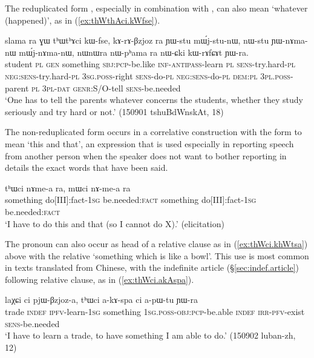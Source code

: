The reduplicated form , especially in combination with , can also mean `whatever (happened)', as in (\ref{ex:thWthAci.kWfse}).
 
 \begin{exe}
\ex \label{ex:thWthAci.kWfse}
\gll  slama ra ɣɯ tʰɯtʰɤci kɯ-fse, kɤ-rɤ-βzjoz ra ɲɯ-stu mɯ́j-stu-nɯ, nɯ-stu ɲɯ-nɤma-nɯ mɯ́j-nɤma-nɯ,  nɯnɯra nɯ-pʰama ra nɯ-ɕki kɯ-rɤfɕɤt ɲɯ-ra. \\
student \textsc{pl} \textsc{gen} something \textsc{sbj}:\textsc{pcp}-be.like \textsc{inf}-\textsc{antipass}-learn \textsc{pl} \textsc{sens}-try.hard-\textsc{pl} \textsc{neg}:\textsc{sens}-try.hard-\textsc{pl} \textsc{3sg}.\textsc{poss}-right \textsc{sens}-do-\textsc{pl} \textsc{neg}:\textsc{sens}-do-\textsc{pl} \textsc{dem}:\textsc{pl} \textsc{3pl}.\textsc{poss}-parent \textsc{pl} \textsc{3pl}-\textsc{dat} \textsc{genr}:S/O-tell \textsc{sens}-be.needed \\
\glt `One has to tell the parents whatever concerns the students, whether they study seriously and try hard or not.'   (150901 tshuBdWnskAt, 18)
 \end{exe}
  
The non-reduplicated form  occurs in a correlative construction with the form  to mean `this and that', an expression that is used especially in reporting speech from another person when the speaker does not want to bother reporting in details the exact words that have been said.

\begin{exe}
\ex \label{ex:thWci.mWci}
\gll tʰɯci nɤme-a ra, mɯci nɤ-me-a ra \\
something do[III]:fact-\textsc{1sg} be.needed:\textsc{fact} something do[III]:fact-\textsc{1sg} be.needed:\textsc{fact} \\
\glt `I have to do this and that (so I cannot do X).' (elicitation)
 \end{exe}
 
The pronoun   can also occur as head of a relative clause as in (\ref{ex:thWci.khWtsa}) above with the relative  `something which is like a bowl'. This use is most common in texts translated from Chinese, with the indefinite article  (§\ref{sec:indef.article}) following relative clause, as in (\ref{ex:thWci.akAspa}). 

\begin{exe}
\ex \label{ex:thWci.akAspa}
\gll  laχɕi ci pjɯ-βzjoz-a, tʰɯci a-kɤ-spa ci a-pɯ-tu ɲɯ-ra  \\
 trade \textsc{indef} \textsc{ipfv}-learn-\textsc{1sg} something \textsc{1sg}.\textsc{poss}-\textsc{obj}:\textsc{pcp}-be.able \textsc{indef} \textsc{irr}-\textsc{pfv}-exist \textsc{sens}-be.needed \\
 \glt `I have to learn a trade, to have something I am able to do.' (150902 luban-zh, 12)
\end{exe}
 
